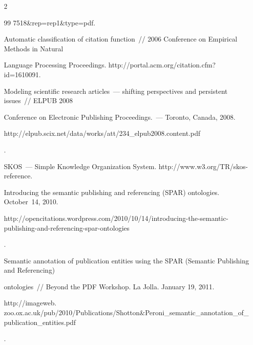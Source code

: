 \begin{multicols}{2}
{{\begin{thebibliography}{99}
{7518\&rep=rep1\&type=pdf}.









Automatic classification of citation function~// 2006 Conference on Empirical Methods in Natural 


Language Processing Proceedings. {\sf http://portal.acm.org/citation.cfm?id=1610091}.









Modeling scientific research articles~--- shifting perspectives and persistent issues~// ELPUB 2008 


Conference on Electronic Publishing Proceedings.~--- Toronto, Canada, 2008. {\sf 


http://elpub.scix.net/\linebreak data/works/att/234\_elpub2008.content.pdf}.







SKOS~--- Simple Knowledge Organization System. {\sf http://www.w3.org/TR/skos-reference}.









Introducing the semantic publishing and referencing (SPAR) ontologies. October~14, 2010. {\sf 


http://\linebreak opencitations.wordpress.com/2010/10/14/introducing-\linebreak the-semantic-publishing-and-referencing-spar-ontologies}.









Semantic annotation of publication entities using the SPAR (Semantic Publishing and Referencing) 


ontologies~// Beyond the PDF Workshop. La Jolla. January 19, 2011. {\sf 


http://imageweb. zoo.ox.ac.uk/pub/2010/Publications/Shotton\&Peroni\_\linebreak semantic\_annotation\_of\_publication\_entities.pdf}.






\end{thebibliography}}}
\end{multicols}
